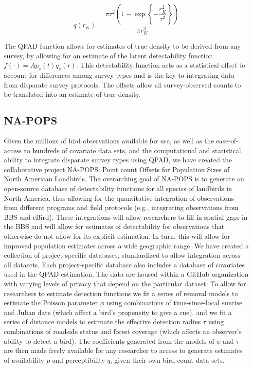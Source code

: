 \documentclass[]{article}
\begin{document}
\begin{equation*}
	q(r_K) = \dfrac{\pi \tau^2 \left( 1 - \exp{\left\{ -\dfrac{r_K^2}{\tau^2} \right\}} \right)}{\pi r_K^2}
\end{equation*}

The QPAD function allows for estimates of true density to be derived from any survey, by allowing for an estimate of the latent detectability function $f(\cdot)=Ap_s(t)q_s(r)$. This detectability function acts as a statistical offset to account for differences among survey types and is the key to integrating data from disparate survey protocols. The offsets allow all survey-observed counts to be translated into an estimate of true density.

\subsection{NA-POPS}
Given the millions of bird observations available for use, as well as the ease-of-access to hundreds of covariate data sets, and the computational and statistical ability to integrate disparate survey types using QPAD, we have created the collaborative project NA-POPS: Point count Offsets for Population Sizes of North American Landbirds. The overarching goal of NA-POPS is to generate an open-source database of detectability functions for all species of landbirds in North America, thus allowing for the quantitative integration of observations from different programs and field protocols (e.g., integrating observations from BBS and eBird). These integrations will allow researchers to fill in spatial gaps in the BBS and will allow for estimates of detectability for observations that otherwise do not allow for its explicit estimation. In turn, this will allow for improved population estimates across a wide geographic range.
We have created a collection of project-specific databases, standardized to allow integration across all datasets. Each project-specific database also includes a database of covariates used in the QPAD estimation. The data are housed within a GitHub organization with varying levels of privacy that depend on the particular dataset. To allow for researchers to estimate detection functions we fit a series of removal models to estimate the Poisson parameter $\phi$ using combinations of time-since-local sunrise and Julian date (which affect a bird’s propensity to give a cue), and we fit a series of distance models to estimate the effective detection radius $\tau$ using combinations of roadside status and forest coverage (which affects an observer’s ability to detect a bird). The coefficients generated from the models of $\phi$ and $\tau$ are then made freely available for any researcher to access to generate estimates of availability $p$ and perceptibility $q$, given their own bird count data sets.
\end{document}
